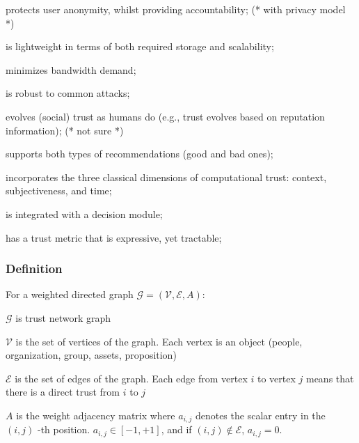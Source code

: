 \documentclass{article}
\begin{document}
\item protects user anonymity, whilst providing accountability; (* with privacy model *)


\item is lightweight in terms of both required storage and scalability;


\item minimizes bandwidth demand;


\item is robust to common attacks;


\item evolves (social) trust as humans do (e.g., trust evolves based on reputation information); (* not sure *)


\item supports both types of recommendations (good and bad ones);


\item incorporates the three classical dimensions of computational trust: context, subjectiveness, and time;


\item is integrated with a decision module;


\item has a trust metric that is expressive, yet tractable;


\subsubsection{Definition}



For a weighted directed graph \(\mathcal{G}=(\mathcal{V},\mathcal{E},A)\):


\item \(\mathcal{G}\) is trust network graph


\item \(\mathcal{V}\) is the set of vertices of the graph. Each vertex is an object (people, organization, group, assets, proposition)


\item \(\mathcal{E}\) is the set of edges of the graph. Each edge from vertex \(i\) to vertex \(j\) means that there is a direct trust from \(i\)
to \(j\)


\item \(A\) is the weight adjacency matrix where \(a_{i,j}\) denotes the scalar entry in the \((i,j)\) -th position. \(a_{i,j}\in [-1,+1]\), and
if \((i,j)\notin \mathcal{E}\), \(a_{i,j}=0\).
\end{document}
